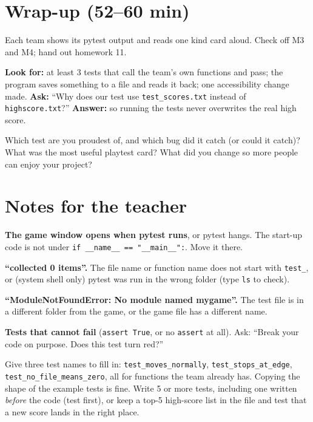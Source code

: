 \section{Wrap-up (52--60 min)}
Each team shows its pytest output and reads one kind card aloud. Check off M3 and M4; hand out homework 11.

\begin{formativecheck}
\textbf{Look for:} at least 3 tests that call the team's own functions and pass; the program saves
something to a file and reads it back; one accessibility change made.
\textbf{Ask:} “Why does our test use \texttt{test\_scores.txt} instead of \texttt{highscore.txt}?”
\textbf{Answer:} so running the tests never overwrites the real high score.
\end{formativecheck}

\begin{reflection}
Which test are you proudest of, and which bug did it catch (or could it catch)? What was the most
useful playtest card? What did you change so more people can enjoy your project?
\end{reflection}

\section{Notes for the teacher}
\begin{commonmistakes}
  \item \textbf{The game window opens when pytest runs}, or pytest hangs. The start-up code is not under \texttt{if \_\_name\_\_ == "\_\_main\_\_":}. Move it there.
  \item \textbf{\enquote{collected 0 items}.} The file name or function name does not start with \texttt{test\_}, or (system shell only) pytest was run in the wrong folder (type \texttt{ls} to check).
  \item \textbf{\enquote{ModuleNotFoundError: No module named mygame}.} The test file is in a different folder from the game, or the game file has a different name.
  \item \textbf{Tests that cannot fail} (\texttt{assert True}, or no \texttt{assert} at all). Ask: \enquote{Break your code on purpose. Does this test turn red?}
\end{commonmistakes}

\begin{differentiation}
\supportpath Give three test names to fill in: \texttt{test\_moves\_normally}, \texttt{test\_stops\_at\_edge},
\texttt{test\_no\_file\_means\_zero}, all for functions the team already has. Copying the shape of
the example tests is fine.
\extensionpath Write 5 or more tests, including one written \emph{before} the code (test first),
or keep a top-5 high-score list in the file and test that a new score lands in the right place.
\end{differentiation}

